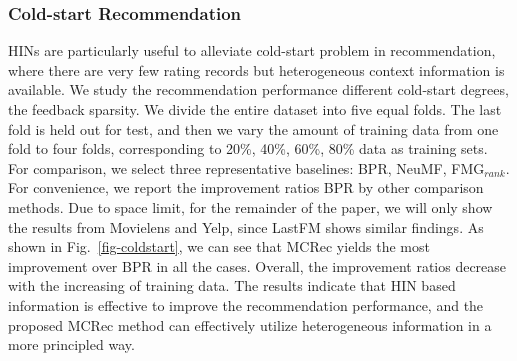 \subsubsection{Cold-start Recommendation}
HINs are particularly useful to alleviate  cold-start problem in recommendation, where there are very few rating records but heterogeneous context
information is available. We study the recommendation performance \wrt different cold-start degrees, \ie the feedback sparsity.
We divide the entire dataset into five equal folds. The last fold is held out for test, and then we vary the amount of training data from one fold to four folds, corresponding to 20\%, 40\%, 60\%, 80\% data as training sets.  For comparison, we select three representative baselines: BPR, NeuMF, FMG$_{rank}$.
For convenience, we report the improvement ratios \wrt BPR by other comparison methods. Due to space limit, for the remainder of the paper, we will only show the results from Movielens and Yelp, since LastFM shows similar findings. 
As shown in Fig.~\ref{fig-coldstart}, we can see that MCRec yields the most improvement over BPR in all the cases. Overall, the improvement ratios decrease with the increasing of training data. The results indicate that HIN based information is effective to improve the recommendation performance, and the proposed MCRec method can effectively utilize heterogeneous information in a more principled way.



